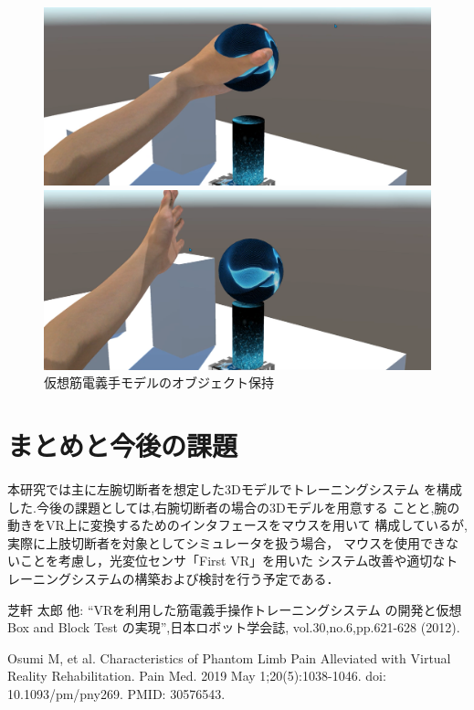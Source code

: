 \documentclass{ltjsarticle}
\begin{document}
		\begin{figure}[H]
		\centering
		\begin{minipage}{0.4\columnwidth}
		\centering
		\includegraphics[width = \columnwidth]{figs/spheregrap2.png}
		\end{minipage}
		\hspace{0.05\columnwidth}
		\begin{minipage}{0.4\columnwidth}
		\centering
		\includegraphics[width = \columnwidth]{figs/spherereleace.png}
		\end{minipage}
		\caption{仮想筋電義手モデルのオブジェクト保持}
		\label{fig:spheregrap}
		\end{figure}
		\vspace{-20pt}



\section{まとめと今後の課題}
	本研究では主に左腕切断者を想定した3Dモデルでトレーニングシステム
	を構成した.今後の課題としては,右腕切断者の場合の3Dモデルを用意する
	ことと,腕の動きをVR上に変換するためのインタフェースをマウスを用いて
	構成しているが,実際に上肢切断者を対象としてシミュレータを扱う場合，
	マウスを使用できないことを考慮し，光変位センサ「First VR」を用いた
	システム改善や適切なトレーニングシステムの構築および検討を行う予定である．
\begin{thebibliography}{99}%
	芝軒 太郎 他:
	``VRを利用した筋電義手操作トレーニングシステム
	の開発と仮想 Box and Block Test の実現'',日本ロボット学会誌,
	vol.30,no.6,pp.621-628 (2012).

	Osumi M, et al.
	Characteristics of Phantom Limb Pain Alleviated with Virtual 
	Reality Rehabilitation. Pain Med. 2019 May 1;20(5):1038-1046.
	doi: 10.1093/pm/pny269. PMID: 30576543.
\end{thebibliography}
\end{document}
